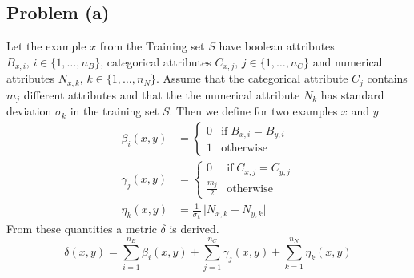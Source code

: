 \subsection*{Problem (a)}

Let the example $x$ from the Training set $S$ have boolean attributes
$B_{x,i},\, i\in\{1,\ldots,n_{B}\}$, categorical attributes $C_{x,j},\, j\in\{1,\ldots,n_{C}\}$
and numerical attributes $N_{x,k},\, k\in\{1,\ldots,n_{N}\}$. Assume
that the categorical attribute $C_{j}$ contains $m_{j}$ different
attributes and that the the numerical attribute $N_{k}$ has standard
deviation $\sigma_{k}$ in the training set $S$. Then we define for
two examples $x$ and $y$
\begin{align*}
\beta_{i}(x,y) & =\begin{cases}
0 & \text{if}\; B_{x,i}=B_{y,i}\\
1 & \text{otherwise}
\end{cases}\\
\gamma_{j}(x,y) & =\begin{cases}
0 & \text{if}\; C_{x,j}=C_{y,j}\\
\frac{m_{j}}{2} & \text{otherwise}
\end{cases}\\
\eta_{k}(x,y) & =\frac{1}{\sigma_{k}}\,\vert N_{x,k} - N_{y,k}\vert
\end{align*}
From these quantities a metric $\delta$ is derived.
\[
\delta(x,y)=\sum_{i=1}^{n_{B}}\beta_{i}(x,y)+\sum_{j=1}^{n_{C}}\gamma_{j}(x,y)+\sum_{k=1}^{n_{N}}\eta_{k}(x,y)
\]